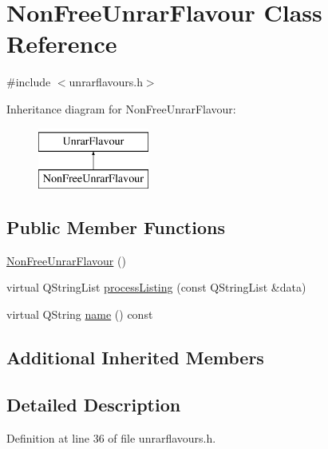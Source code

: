 \hypertarget{classNonFreeUnrarFlavour}{\section{Non\+Free\+Unrar\+Flavour Class Reference}
\label{classNonFreeUnrarFlavour}
}


{\ttfamily \#include $<$unrarflavours.\+h$>$}

Inheritance diagram for Non\+Free\+Unrar\+Flavour\+:\begin{figure}[H]
\begin{center}
\leavevmode
\includegraphics[height=2.000000cm]{classNonFreeUnrarFlavour}
\end{center}
\end{figure}
\subsection*{Public Member Functions}
\begin{DoxyCompactItemize}
\item 
\hyperlink{classNonFreeUnrarFlavour_a3f87f41749539bc8192fa3fb3e3374d5}{Non\+Free\+Unrar\+Flavour} ()
\item 
virtual Q\+String\+List \hyperlink{classNonFreeUnrarFlavour_a1d88709f1a1a210f8f8ffe623c9292c9}{process\+Listing} (const Q\+String\+List \&data)
\item 
virtual Q\+String \hyperlink{classNonFreeUnrarFlavour_a0b74e473c37a4b8416c0ccc12703b4af}{name} () const 
\end{DoxyCompactItemize}
\subsection*{Additional Inherited Members}


\subsection{Detailed Description}


Definition at line 36 of file unrarflavours.\+h.




